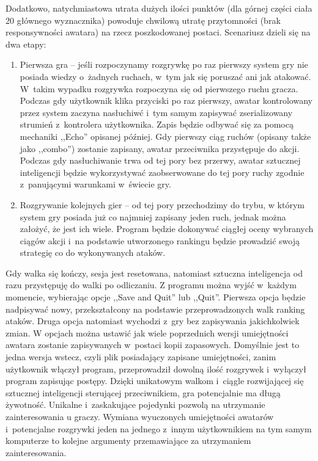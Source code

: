 \documentclass[brudnopis]{xmgr}
\begin{document}
Dodatkowo, natychmiastowa utrata dużych ilości punktów (dla górnej części
ciała 20%
głównego wyznacznika) powoduje chwilową utratę przytomności (brak
responsywności awatara) na rzecz
poszkodowanej postaci.
Scenariusz dzieli się na dwa etapy:
\begin{enumerate}
\item Pierwsza gra -- jeśli rozpoczynamy rozgrywkę po raz pierwszy system gry nie
posiada wiedzy o~żadnych ruchach, w~tym jak
się poruszać ani jak atakować. W~takim wypadku rozgrywka rozpoczyna się od
pierwszego ruchu gracza.
Podczas gdy użytkownik klika przyciski po raz pierwszy, awatar kontrolowany przez system zaczyna
nasłuchiwć i~tym samym zapisywać
zserializowany strumień z~kontrolera użytkownika. Zapis będzie odbywać się
za pomocą mechaniki ,,Echo'' opisanej później. Gdy pierwszy ciąg ruchów
(opisany także jako ,,combo'') zostanie
zapisany, awatar przeciwnika przystępuje do akcji. Podczas gdy nasłuchiwanie trwa od tej
pory bez przerwy, awatar sztucznej inteligencji będzie wykorzystywać
zaobserwowane do tej pory ruchy zgodnie z~panującymi
warunkami w~świecie gry.
\item Rozgrywanie kolejnych gier -- od tej pory przechodzimy do trybu, w
którym system gry posiada już co najmniej zapisany jeden ruch, jednak
można założyć, że jest ich wiele. Program będzie dokonywać
ciągłej oceny wybranych ciągów akcji i~na podstawie utworzonego rankingu
będzie prowadzić swoją strategię co do wykonywanych ataków.
\end{enumerate}
Gdy walka się kończy, sesja jest resetowana, natomiast sztuczna
inteligencja od razu przystępuję do walki po odliczaniu.
Z programu można wyjść w~każdym momencie, wybierając opcje ,,Save and Quit'' lub
 ,,Quit''. Pierwsza opcja będzie nadpisywać nowy, przekształcony na
podstawie przeprowadzonych walk ranking ataków.
Druga opcja natomiast wychodzi z~gry bez zapisywania jakichkolwiek zmian.
W opcjach można ustawić jak wiele poprzednich wersji umiejętności awatara zostanie
zapisywanych w~postaci kopii
zapasowych. Domyślnie jest to jedna wersja wstecz, czyli plik posiadający
zapisane umiejętności, zanim
użytkownik włączył program, przeprowadził dowolną ilość rozgrywek i~wyłączył program
zapisując postępy.
Dzięki unikatowym walkom i~ciągle rozwijającej się sztucznej
inteligencji sterującej
przeciwnikiem, gra potencjalnie ma długą żywotność. Unikalne i~zaskakujące
pojedynki pozwolą na utrzymanie zainteresowania u graczy. Wymiana
wyuczonych umiejętności awatarów i~potencjalne rozgrywki jeden na
jednego z~innym użytkownikiem na tym samym komputerze to kolejne argumenty
przemawiające za utrzymaniem zainteresowania.
\end{document}
